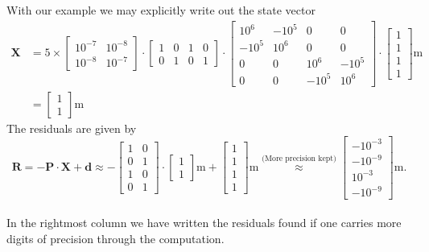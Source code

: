 With our example we may explicitly write out the state vector
\begin{equation}
\begin{split}
\mathbf{X}&=5\times\left[\begin{array}{cc}10^{-7}&10^{-8}\\10^{-8}&10^{-7}\end{array}\right]\cdot\left[\begin{array}{cccc}1&0&1&0\\0&1&0&1\end{array}\right]\cdot \left[\begin{array}{cccc}10^6&-10^5&0&0\\-10^5&10^6&0&0\\0&0&10^6&-10^5\\0&0&-10^5&10^6\end{array}\right]\cdot\left[\begin{array}{c}1\\1\\1\\1\end{array}\right]\text{m}\\
&=\left[\begin{array}{c}1\\1\end{array}\right]\text{m}
\end{split}
\end{equation}
The residuals are given by
\begin{equation}
\mathbf{R}=-\mathbf{P}\cdot\mathbf{X}+\mathbf{d}\approx-\left[\begin{array}{cc}1&0\\0&1\\1&0\\0&1\end{array}\right]\cdot\left[\begin{array}{c}1\\1\end{array}\right]\text{m}+\left[\begin{array}{c}1\\1\\1\\1\end{array}\right]\text{m}\stackrel{\text{(More precision kept)}}{\approx}\left[\begin{array}{c}-10^{-3}\\-10^{-9}\\10^{-3}\\-10^{-9}\end{array}\right]\text{m}.
\end{equation}
{}\\
In the rightmost column we have written the residuals found if one carries more digits of precision through the computation.


